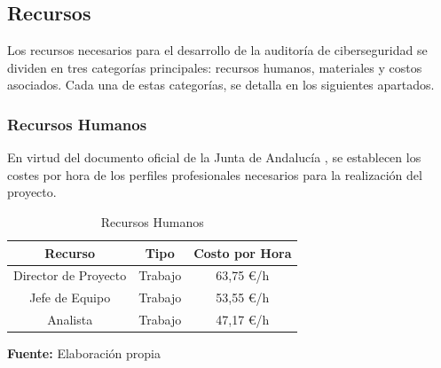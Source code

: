 \documentclass[a4paper, 11pt]{article}
\begin{document}
\par\vspace{0.5cm}



\subsection{Recursos}
\par\vspace{0.5cm}

Los recursos necesarios para el desarrollo de la auditoría de ciberseguridad se dividen en tres categorías principales: recursos humanos, materiales y costos asociados. Cada una de estas categorías, se detalla en los siguientes apartados.
\par\vspace{0.5cm}

\subsubsection{Recursos Humanos}
\par\vspace{0.5cm}

En virtud del documento oficial de la Junta de Andalucía \cite{junta-perfiles}, se establecen los costes por hora de los perfiles profesionales necesarios para la realización del proyecto.
\par\vspace{0.5cm}

\begin{table}[H]
\caption{Recursos Humanos}
\centering
\renewcommand{\arraystretch}{1.5}
\begin{tabular}{|c|c|c|}
\hline
\textbf{Recurso} & \textbf{Tipo} & \textbf{Costo por Hora}  \\ \hline
Director de Proyecto & Trabajo & 63,75 €/h  \\ \hline
Jefe de Equipo & Trabajo & 53,55 €/h  \\ \hline
Analista & Trabajo & 47,17 €/h  \\ \hline
\end{tabular}
\begin{flushleft}\centering
    \footnotesize \textbf{Fuente:} Elaboración propia
\end{flushleft}   
\label{tab:recursos_humanos}
\end{table}
\end{document}
